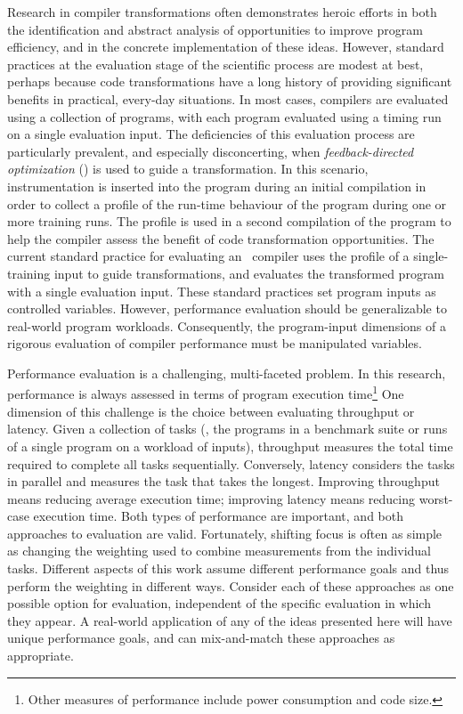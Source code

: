Research in compiler transformations often demonstrates heroic efforts
in both the identification and abstract analysis of opportunities to
improve program efficiency, and in the concrete implementation of
these ideas.  However, standard practices at the evaluation stage of
the scientific process are modest at best, perhaps because code
transformations have a long history of providing significant benefits
in practical, every-day situations.  In most cases, compilers are
evaluated using a collection of programs, with each program evaluated
using a timing run on a single evaluation input.  The deficiencies of
this evaluation process are particularly prevalent, and especially
disconcerting, when {\it feedback-directed optimization} (\FDO) is
used to guide a transformation.  In this scenario, instrumentation is
inserted into the program during an initial compilation in order to
collect a profile of the run-time behaviour of the program during one
or more training runs.  The profile is used in a second compilation of
the program to help the compiler assess the benefit of code
transformation opportunities.  The current standard practice for
evaluating an \FDO\ compiler uses the profile of a single-training
input to guide transformations, and evaluates the transformed program
with a single evaluation input.  These standard practices set program
inputs as controlled variables.  However, performance evaluation
should be generalizable to real-world program workloads.
Consequently, the program-input dimensions of a rigorous evaluation of
compiler performance must be manipulated variables.

Performance evaluation is a challenging, multi-faceted problem.  In
this research, performance is always assessed in terms of program
execution time\footnote{Other measures of performance include power
consumption and code size.}  One dimension of this challenge is the
choice between evaluating throughput or latency.  Given a collection of tasks
(\eg, the programs in a benchmark suite or runs of a single program on
a workload of inputs), throughput measures the total time required to
complete all tasks sequentially.  Conversely, latency considers the
tasks in parallel and measures the task that takes the longest.
Improving throughput means reducing average execution time; improving
latency means reducing worst-case execution time.  Both types of
performance are important, and both approaches to evaluation are
valid. Fortunately, shifting focus is often as simple as changing the
weighting used to combine measurements from the individual tasks.
Different aspects of this work assume different performance goals and
thus perform the weighting in different ways.  Consider each of these
approaches as one possible option for evaluation, independent of the
specific evaluation in which they appear.  A real-world application of
any of the ideas presented here will have unique performance goals,
and can mix-and-match these approaches as appropriate.

